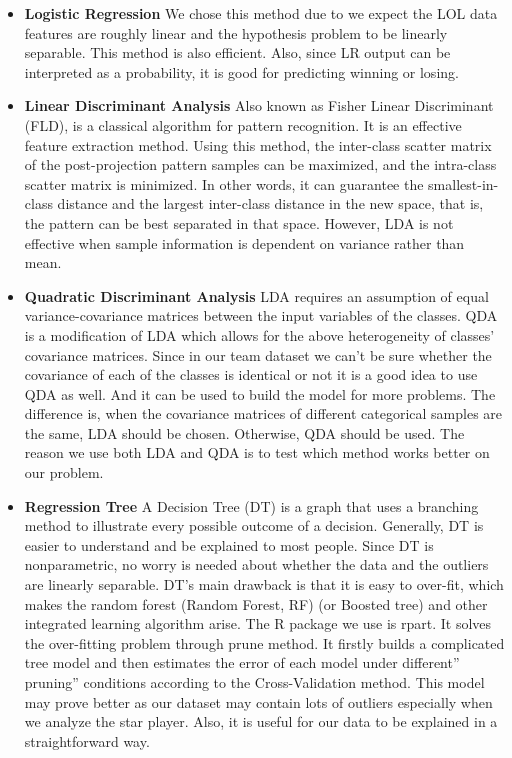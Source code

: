 \documentclass[conference]{IEEEtran}
\begin{document}
\begin{itemize}
  \item \textbf{Logistic Regression}
We chose this method due to we expect the LOL data features are roughly linear and the hypothesis problem to be linearly separable. This method is also efficient. Also, since LR output can be interpreted as a probability, it is good for predicting winning or losing. 

  \item \textbf{Linear Discriminant Analysis }
Also known as Fisher Linear Discriminant (FLD), is a classical algorithm for pattern recognition. It is an effective feature extraction method. Using this method, the inter-class scatter matrix of the post-projection pattern samples can be maximized, and the intra-class scatter matrix is minimized. In other words, it can guarantee the smallest-in-class distance and the largest inter-class distance in the new space, that is, the pattern can be best separated in that space. However, LDA is not effective when sample information is dependent on variance rather than mean.

  \item \textbf{Quadratic Discriminant Analysis }
LDA requires an assumption of equal variance-covariance matrices between the input variables of the classes. QDA is a modification of LDA which allows for the above heterogeneity of classes' covariance matrices. Since in our team dataset we can't be sure whether the covariance of each of the classes is identical or not it is a good idea to use QDA as well. And it can be used to build the model for more problems. The difference is, when the covariance matrices of different categorical samples are the same, LDA should be chosen. Otherwise, QDA should be used. The reason we use both LDA and QDA is to test which method works better on our problem.

  \item \textbf{Regression Tree}
A Decision Tree (DT) is a graph that uses a branching method to illustrate every possible outcome of a decision. Generally, DT is easier to understand and be explained to most people. Since DT is nonparametric, no worry is needed about whether the data and the outliers are linearly separable. DT’s main drawback is that it is easy to over-fit, which makes the random forest (Random Forest, RF) (or Boosted tree) and other integrated learning algorithm arise. The R package we use is rpart. It solves the over-fitting problem through prune method. It firstly builds a complicated tree model and then estimates the error of each model under different” pruning” conditions according to the Cross-Validation method. This model may prove better as our dataset may contain lots of outliers especially when we analyze the star player. Also, it is useful for our data to be explained in a straightforward way.


\end{itemize}
\end{document}
